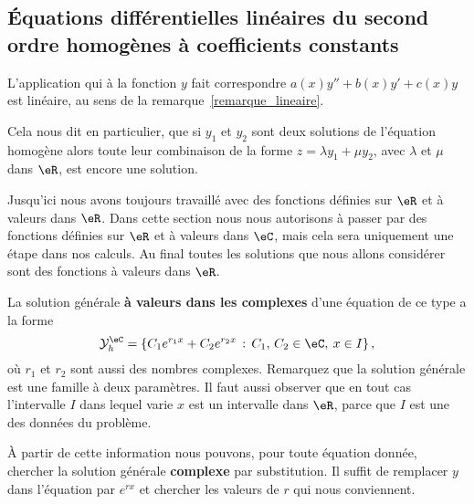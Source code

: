 \subsection{Équations différentielles linéaires du second ordre homogènes à coefficients constants}

\begin{remark}
 L'application qui à la fonction $y$ fait correspondre $a(x)y'' + b(x) y' + c(x)y$ est linéaire, au sens de la remarque~\ref{remarque_lineaire}.

Cela nous dit en particulier, que si $y_1$ et $y_2$ sont deux solutions de l'équation homogène alors toute leur combinaison de la forme $z = \lambda y_1 + \mu y_2$, avec $\lambda$ et $\mu$ dans $\eR$, est encore une solution.
 \end{remark}

\begin{framed}
  Jusqu'ici nous avons toujours travaillé avec des fonctions définies sur $\eR$ et à valeurs dans $\eR$. Dans cette section nous nous autorisons à passer par des fonctions définies sur $\eR$ et à valeurs dans $\eC$, mais cela sera uniquement une étape dans nos calculs. Au final toutes les solutions que nous allons considérer sont des fonctions à valeurs dans $\eR$.
\end{framed}

La solution générale \textbf{à valeurs dans les complexes} d'une équation de ce type a la forme
\begin{equation}\label{sol_gen_ordre_deux_hom}
  \mathcal{Y}_h^\eC  = \left\{C_1 e^{r_1x} +C_2 e^{r_2x} \,:\, C_1,\, C_2 \in \eC, \: x\in I \right\},
\end{equation}
où $r_1$ et $r_2$ sont aussi des nombres complexes. Remarquez que la solution générale est une famille à deux paramètres. Il faut aussi observer que en tout cas l'intervalle $I$ dans lequel varie $x$ est un intervalle dans $\eR$, parce que $I$ est une des données du problème.

À partir de cette information nous pouvons, pour toute équation donnée, chercher la solution générale \textbf{complexe} par substitution. Il suffit de remplacer $y$ dans l'équation par $e^{rx}$ et chercher les valeurs de $r$ qui nous conviennent.

